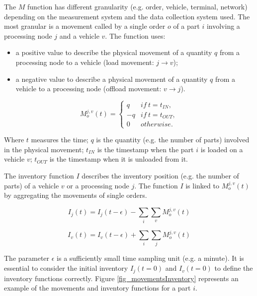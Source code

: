 The $M$ function has different granularity (e.g. order, vehicle, terminal, network) depending on the measurement system and the data collection system used. The most granular is a movement called by a single order $o$ of a part $i$ involving a processing node $j$ and a vehicle $v$. The function uses:

\begin{itemize}
    \item a positive value to describe the physical movement of a quantity $q$ from a processing node to a vehicle (load movement: $j\rightarrow v$);
    \item a negative value to describe a physical movement of a quantity $q$ from a vehicle to a processing node (offload movement: $v\rightarrow j$).
\end{itemize}


\begin{equation}
M_o^{j,v}(t) =\left\{
                \begin{array}{ll}
                 q & if \  t=t_{IN}, \\
                -q & if \  t=t_{OUT}, \\
                0 & otherwise.
                \end{array}
              \right.
\label{eq_movements}
\end{equation}

Where $t$ measures the time; $q$ is the quantity (e.g. the number of parts) involved in the physical movement; $t_{IN}$ is the timestamp when the part $i$ is loaded on a vehicle $v$; $t_{OUT}$ is the timestamp when it is unloaded from it.\par

The inventory function $I$ describes the inventory position (e.g. the number of parts) of a vehicle $v$ or a processing node $j$. The function $I$ is linked to $M_o^{j,v}(t)$ by aggregating the movements of single orders.\par

\begin{equation}
I_j(t) = I_j(t-\epsilon) -\sum_{i}\sum_{v}M_o^{j,v}(t) 
\label{eqInvj}
\end{equation}

\begin{equation}
I_v(t) = I_v(t-\epsilon) +\sum_{i}\sum_{j}M_o^{j,v}(t) 
\label{eqInvv}
\end{equation}

The parameter $\epsilon$ is a sufficiently small time sampling unit (e.g. a minute). It is essential to consider the initial inventory $I_j(t=0)$ and $I_v(t=0)$ to define the inventory functions correctly. Figure \ref{fig_movementsInventory} represents an example of the movements and inventory functions for a part $i$. 

